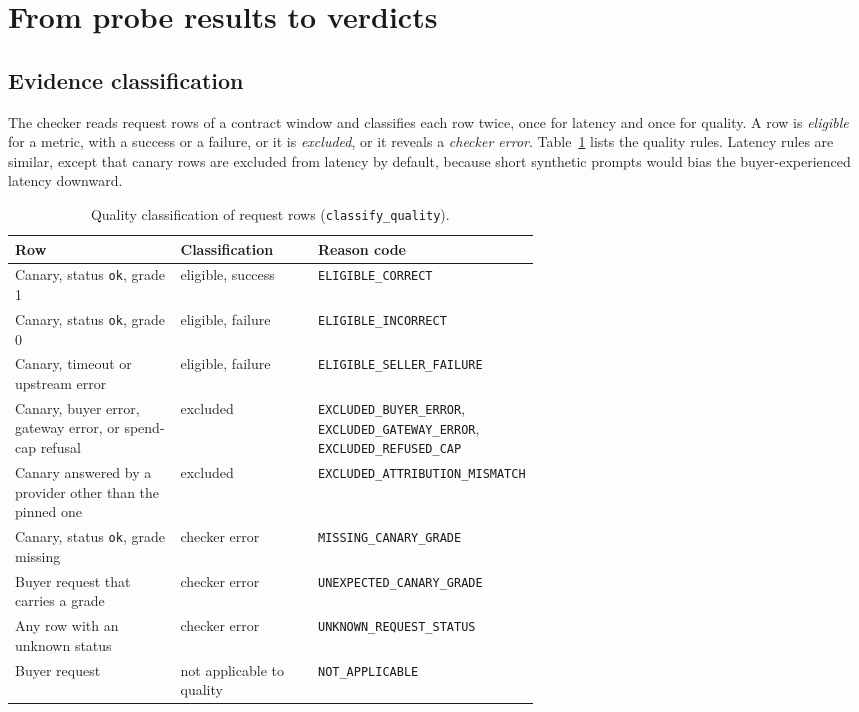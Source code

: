\section{From probe results to verdicts}
\label{sec:verdict}

\subsection{Evidence classification}
\label{sec:evidence}

The checker reads request rows of a contract window and classifies each row
twice, once for latency and once for quality. A row is \emph{eligible} for a
metric, with a success or a failure, or it is \emph{excluded}, or it reveals a
\emph{checker error}. Table~\ref{tab:evidence} lists the quality rules.
Latency rules are similar, except that canary rows are excluded from latency by
default, because short synthetic prompts would bias the buyer-experienced
latency downward.

\begin{table}[htbp]
  \centering
  \small
  \begin{tabularx}{\linewidth}{@{}p{0.34\linewidth}p{0.27\linewidth}X@{}}
    \toprule
    Row & Classification & Reason code \\
    \midrule
    Canary, status \texttt{ok}, grade 1 & eligible, success &
      \texttt{ELIGIBLE\_CORRECT} \\
    Canary, status \texttt{ok}, grade 0 & eligible, failure &
      \texttt{ELIGIBLE\_INCORRECT} \\
    Canary, timeout or upstream error & eligible, failure &
      \texttt{ELIGIBLE\_SELLER\_FAILURE} \\
    Canary, buyer error, gateway error, or spend-cap refusal & excluded &
      \texttt{EXCLUDED\_BUYER\_ERROR}, \texttt{EXCLUDED\_GATEWAY\_ERROR},
      \texttt{EXCLUDED\_REFUSED\_CAP} \\
    Canary answered by a provider other than the pinned one & excluded &
      \texttt{EXCLUDED\_ATTRIBUTION\_MISMATCH} \\
    Canary, status \texttt{ok}, grade missing & checker error &
      \texttt{MISSING\_CANARY\_GRADE} \\
    Buyer request that carries a grade & checker error &
      \texttt{UNEXPECTED\_CANARY\_GRADE} \\
    Any row with an unknown status & checker error &
      \texttt{UNKNOWN\_REQUEST\_STATUS} \\
    Buyer request & not applicable to quality & \texttt{NOT\_APPLICABLE} \\
    \bottomrule
  \end{tabularx}
  \caption{Quality classification of request rows (\texttt{classify\_quality}).}
  \label{tab:evidence}
\end{table}

